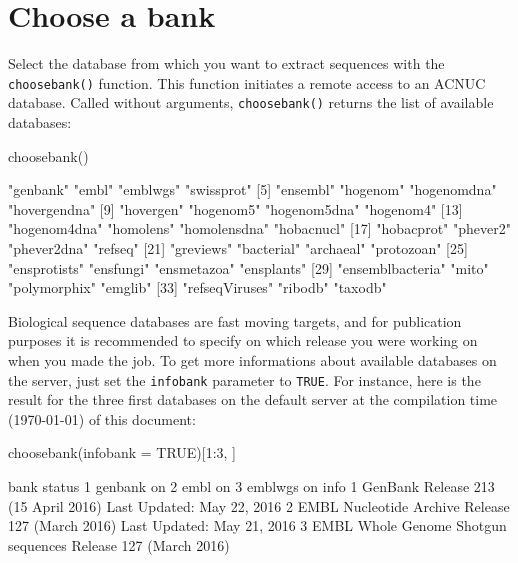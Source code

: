 \documentclass{article}
\begin{document}
\section{Choose a bank}

Select the database from which you want to extract sequences with the \texttt{choosebank()} function.
This function initiates a remote access to an ACNUC database. Called without arguments,
\texttt{choosebank()} returns the list of available databases:


\begin{Schunk}
\begin{Sinput}
 choosebank()
\end{Sinput}
\begin{Soutput}
 [1] "genbank"         "embl"            "emblwgs"         "swissprot"      
 [5] "ensembl"         "hogenom"         "hogenomdna"      "hovergendna"    
 [9] "hovergen"        "hogenom5"        "hogenom5dna"     "hogenom4"       
[13] "hogenom4dna"     "homolens"        "homolensdna"     "hobacnucl"      
[17] "hobacprot"       "phever2"         "phever2dna"      "refseq"         
[21] "greviews"        "bacterial"       "archaeal"        "protozoan"      
[25] "ensprotists"     "ensfungi"        "ensmetazoa"      "ensplants"      
[29] "ensemblbacteria" "mito"            "polymorphix"     "emglib"         
[33] "refseqViruses"   "ribodb"          "taxodb"         
\end{Soutput}
\end{Schunk}
 

Biological sequence databases are fast moving targets, and for publication purposes it is
recommended to specify on which release you were working on when you made the job.
To get more informations about available databases on the server, just set 
the \texttt{infobank} parameter to \texttt{TRUE}. For
instance, here is the result for the three first databases on the default server 
at the compilation time (\today) of this document:

\begin{Schunk}
\begin{Sinput}
 choosebank(infobank = TRUE)[1:3, ]
\end{Sinput}
\begin{Soutput}
     bank status
1 genbank     on
2    embl     on
3 emblwgs     on
                                                                         info
1              GenBank Release 213 (15 April 2016) Last Updated: May 22, 2016
2 EMBL Nucleotide Archive Release 127 (March 2016) Last Updated: May 21, 2016
3                EMBL Whole Genome Shotgun sequences Release 127 (March 2016)
\end{Soutput}
\end{Schunk}
\end{document}
